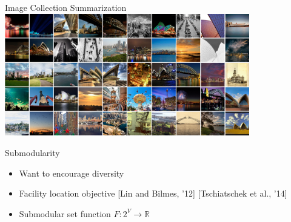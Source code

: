 \documentclass[mathserif]{beamer}
\newcommand{\qcite}[1]{{\scriptsize\color{col2}[#1]}}
\begin{document}
\begin{frame}{Image Collection Summarization}
\centering
\includegraphics[width=4.2in]{figures/flickr_probs_0.png}
\end{frame}

\begin{frame}{Submodularity}
\vspace{0.5em}
\begin{itemize}
\item<1-> Want to encourage diversity
\vspace{1em}
\item<2-> Facility location objective \qcite{Lin and Bilmes, '12} \qcite{Tschiatschek et al., '14}
\vspace{1em}
\item<3-> Submodular set function $F : 2^V \to \mathbb{R}$
\end{itemize}

\vspace{1em}
\centering
{}
\end{frame}
\end{document}
